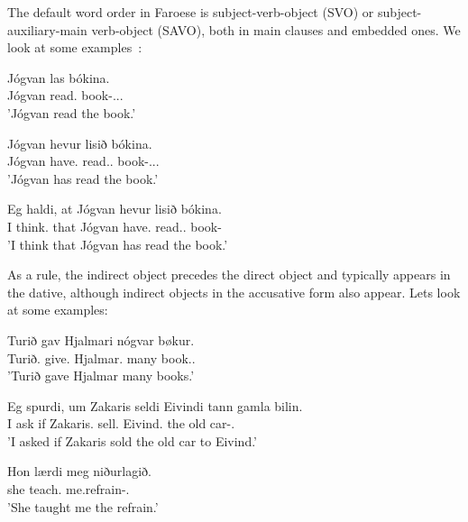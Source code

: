 \documentclass[12pt,%
]{lin-v2/lin}
\begin{document}
The default word order in Faroese is subject-verb-object (SVO) or subject-auxiliary-main verb-object (SAVO), both in main clauses
and embedded ones. We look at some examples~\citep[236]{faroese}:
\begin{exe}
    \ex
    \begin{xlist}
        \item \gll Jógvan las bókina.\\
        Jógvan read.\Pst{} book-\Det.\Acc.\Sg.\F{}\\
        \trans 'Jógvan read the book.'
        \item \gll Jógvan hevur lisið bókina.\\
        Jógvan have.\Pst{} read.\Pst.\Ptcp{} book-\Det.\Acc.\Sg.\F{}\\
        \trans 'Jógvan has read the book.'
        \item \gll Eg haldi, at Jógvan hevur lisið bókina.\\
        I think.\Prs{} that Jógvan have.\Pst{} read.\Pst.\Ptcp{} book-\Det\\
        \trans 'I think that Jógvan has read the book.'
    \end{xlist}
\end{exe}

As a rule, the indirect object precedes the direct object and typically appears in the dative, although
indirect objects in the accusative form also appear. Lets look at some examples:
\begin{exe}
    \ex
    \begin{xlist}
        \item \gll Turið gav Hjalmari nógvar bøkur.\\
        Turið.\Nom{} give.\Pst{} Hjalmar.\Dat{} many book.\Nom.\Pl\\
        \trans 'Turið gave Hjalmar many books.'
        \item \gll Eg spurdi, um Zakaris seldi Eivindi tann gamla bilin.\\
        I ask if Zakaris.\Nom{} sell.\Pst{} Eivind.\Dat{} the old car-\Det.\Acc\\
        \trans 'I asked if Zakaris sold the old car to Eivind.'
        \item \gll Hon lærdi meg niðurlagið.\\
        she teach.\Pst{} me.\Acc refrain-\Det.\Acc\\
        \trans 'She taught me the refrain.'
    \end{xlist}
\end{exe}
\end{document}
